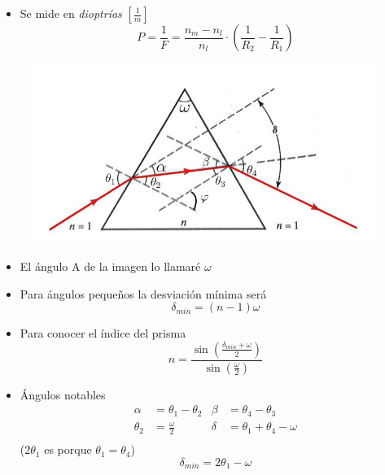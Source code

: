 \begin{itemize}
    \item Se mide en \textit{dioptrías} $\left[\frac{1}{m}\right]$
    \begin{equation}
        P = \frac{1}{F} = \frac{n_m - n_l}{n_l} \cdot \left( \frac{1}{R_2} - \frac{1}{R_1}\right)
    \end{equation}
\end{itemize}

\begin{figure}[h]
    \centering
    \includegraphics[scale=0.3]{images/prisma.jpg}
\end{figure}
\begin{itemize}
    \item El ángulo A de la imagen lo llamaré $\omega$
    
    \item Para ángulos pequeños la desviación mínima será
    \begin{equation}
        \delta_{min} = (n-1) \omega
    \end{equation}
    \item Para conocer el índice del prisma
    \begin{equation}
        n = \frac{\sin(\frac{\delta_{min} + \omega}{2})}{\sin(\frac{\omega}{2})}
    \end{equation}
    \item Ángulos notables
        \begin{align*}
            \alpha    &= \theta_1 - \theta_2  & \beta  &= \theta_4 - \theta_3 \\
            \theta_2  &= \frac{\omega}{2}     & \delta &= \theta_1 + \theta_4 - \omega \\
        \end{align*}
        ($2\theta_1$ es porque $\theta_1 = \theta_4$)
        \begin{equation*}
            \delta_{min} = 2\theta_1 - \omega
        \end{equation*}
\end{itemize}
\newpage